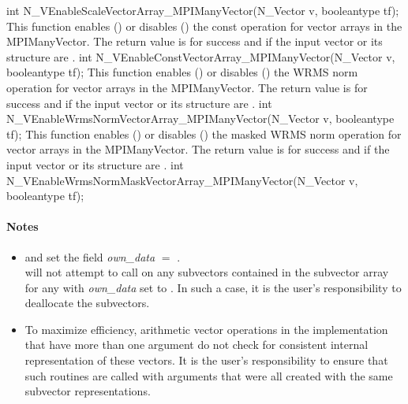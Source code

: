 {
  int N\_VEnableScaleVectorArray\_MPIManyVector(N\_Vector v, booleantype tf);
}
{
  This function enables () or disables () the const
  operation for vector arrays in the MPIManyVector. The return value is  for
  success and  if the input vector or its  structure are .
}
{
  int N\_VEnableConstVectorArray\_MPIManyVector(N\_Vector v, booleantype tf);
}
{
  This function enables () or disables () the WRMS norm
  operation for vector arrays in the MPIManyVector. The return value is  for
  success and  if the input vector or its  structure are .
}
{
  int N\_VEnableWrmsNormVectorArray\_MPIManyVector(N\_Vector v, booleantype tf);
}
{
  This function enables () or disables () the masked WRMS
  norm operation for vector arrays in the MPIManyVector. The return value is
   for success and  if the input vector or its  structure are
  .
}
{
  int N\_VEnableWrmsNormMaskVectorArray\_MPIManyVector(N\_Vector v, booleantype tf);
}
\paragraph{\bf Notes} 
           
\begin{itemize}
                                        
\item
  {\warn} and  set
  the field {\em own\_data} $=$ .  \\
   will not attempt to call
   on any subvectors contained in the subvector array
  for any  with {\em own\_data} set to . In
  such a case, it is the user's responsibility to deallocate the
  subvectors.

\item
  {\warn}To maximize efficiency, arithmetic vector operations in the
  {\nvecmpimanyvector} implementation that have more than one
   argument do not check for consistent internal
  representation of these vectors. It is the user's responsibility to
  ensure that such routines are called with  arguments
  that were all created with the same subvector representations.

\end{itemize}

